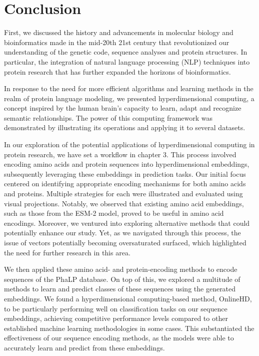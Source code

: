 \chapter{Conclusion}
First, we discussed the history and advancements in molecular biology and bioinformatics made in the mid-20th 21st century that revolutionized our understanding of the genetic code, sequence analyses and protein structures. In particular, the integration of natural language processing (NLP) techniques into protein research that has further expanded the horizons of bioinformatics.

In response to the need for more efficient algorithms and learning methods in the realm of protein language modeling, we presented hyperdimensional computing, a concept inspired by the human brain's capacity to learn, adapt and recognize semantic relationships. The power of this computing framework was demonstrated by illustrating its operations and applying it to several datasets.

In our exploration of the potential applications of hyperdimensional computing in protein research, we have set a workflow in chapter 3. This process involved encoding amino acids and protein sequences into hyperdimensional embeddings, subsequently leveraging these embeddings in prediction tasks. Our initial focus centered on identifying appropriate encoding mechanisms for both amino acids and proteins. Multiple strategies for each were illustrated and evaluated using visual projections. Notably, we observed that existing amino acid embeddings, such as those from the ESM-2 model, proved to be useful in amino acid encodings. Moreover, we ventured into exploring alternative methods that could potentially enhance our study. Yet, as we navigated through this process, the issue of vectors potentially becoming oversaturated surfaced, which highlighted the need for further research in this area.

We then applied these amino acid- and protein-encoding methods to encode sequences of the PhaLP database. On top of this, we explored a multitude of methods to learn and predict classes of these sequences using the generated embeddings. We found a hyperdimensional computing-based method, OnlineHD, to be particularly performing well on classification tasks on our sequence embeddings, achieving competitive performance levels compared to other established machine learning methodologies in some cases. This substantiated the effectiveness of our sequence encoding methods, as the models were able to accurately learn and predict from these embeddings.

